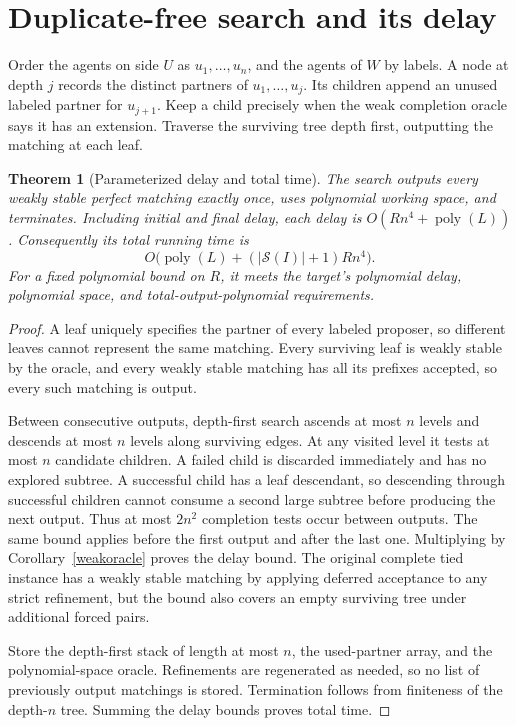 \documentclass[11pt]{article}
\newtheorem{theorem}{Theorem}
\theoremstyle{remark}
\begin{document}
\section{Duplicate-free search and its delay}
Order the agents on side $U$ as $u_1,\ldots,u_n$, and the agents of $W$
by labels. A node at depth $j$ records the distinct partners of
$u_1,\ldots,u_j$. Its children append an unused labeled partner for
$u_{j+1}$. Keep a child precisely when the weak completion oracle says
it has an extension. Traverse the surviving tree depth first, outputting
the matching at each leaf.

\begin{theorem}[Parameterized delay and total time]\label{delay}
The search outputs every weakly stable perfect matching exactly once,
uses polynomial working space, and terminates. Including initial and
final delay, each delay is $O(R n^4+\operatorname{poly}(L))$.
Consequently its total running time is
\[
 O\bigl(\operatorname{poly}(L)+(|\mathcal S(I)|+1)R n^4\bigr).
\]
For a fixed polynomial bound on $R$, it meets the target's polynomial
delay, polynomial space, and total-output-polynomial requirements.
\end{theorem}
\begin{proof}
A leaf uniquely specifies the partner of every labeled proposer, so
different leaves cannot represent the same matching. Every surviving
leaf is weakly stable by the oracle, and every weakly stable matching
has all its prefixes accepted, so every such matching is output.

Between consecutive outputs, depth-first search ascends at most $n$
levels and descends at most $n$ levels along surviving edges. At any
visited level it tests at most $n$ candidate children. A failed child
is discarded immediately and has no explored subtree. A successful
child has a leaf descendant, so descending through successful children
cannot consume a second large subtree before producing the next output.
Thus at most $2n^2$ completion tests occur between outputs. The same
bound applies before the first output and after the last one. Multiplying
by Corollary~\ref{weakoracle} proves the delay bound. The original
complete tied instance has a weakly stable matching by applying deferred
acceptance to any strict refinement, but the bound also covers an empty
surviving tree under additional forced pairs.

Store the depth-first stack of length at most $n$, the used-partner
array, and the polynomial-space oracle. Refinements are regenerated
as needed, so no list of previously output matchings is stored.
Termination follows from finiteness of the depth-$n$ tree. Summing the
delay bounds proves total time.
\end{proof}
\end{document}
